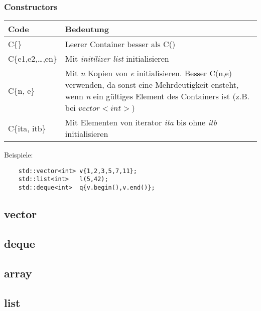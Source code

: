 \subsubsection{Constructors}
	\begin{tabularx}{\columnwidth}{lX}
		Code & Bedeutung \\
		\hline
		C\{\} & Leerer Container besser als C() \\
		C\{e1,e2,\ldots,en\} & Mit \emph{initilizer list} initialisieren \\
		C\{n, e\} & Mit \emph{n} Kopien von \emph{e} initialisieren.  Besser C(n,e) verwenden, da sonst eine Mehrdeutigkeit ensteht, wenn \emph{n} ein gültiges Element des Containers ist (z.B. bei $vector<int>$) \\
		C\{ita, itb\} & Mit Elementen von iterator \emph{ita} bis ohne \emph{itb} initialisieren \\
	\end{tabularx}
	Beispiele:
\begin{lstlisting}
	std::vector<int> v{1,2,3,5,7,11};
	std::list<int>   l(5,42);
	std::deque<int>  q{v.begin(),v.end()};
\end{lstlisting}

\subsection{vector}

\subsection{deque}

\subsection{array}

\subsection{list}

